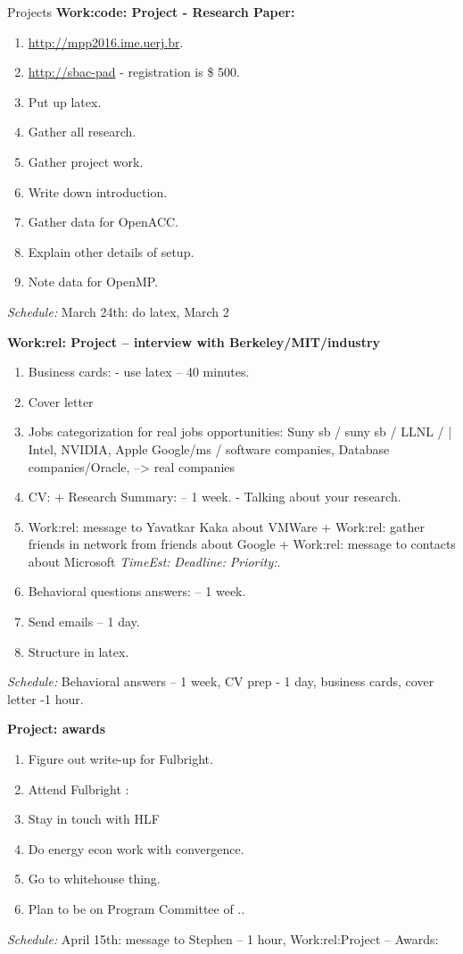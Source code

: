 \documentclass[serif, mathserif, final]{beamer}
\newcommand{\te}[1]{\textit{TimeEst:}\textit{#1}}
\newcommand{\dl}[1]{\textit{Deadline:}\textit{#1}}
\newcommand{\pr}[1]{\textit{Priority:}\textit{#1}}
\begin{document}
\begin{frame}
\begin{columns}
\begin{block}{Projects}
{\bf Work:code: Project - Research Paper:}  
\begin{enumerate} 
\item \tiny \url{http://mpp2016.ime.uerj.br}. 
\item \tiny \url {http://sbac-pad}  - registration is  \$ 500. 
\item \tiny Put up latex.  
\item \tiny Gather all research. 
\item \tiny Gather project work. 
\item \tiny Write down introduction.
\item \tiny Gather data for OpenACC. 
\item \tiny Explain other details of setup. 
\item \tiny Note data for OpenMP. 
\end{enumerate} 
\textit{Schedule:} March 24th: do latex, March 2

{\bf Work:rel: Project – interview with Berkeley/MIT/industry} 
\begin{enumerate} 
\tiny \item \tiny Business cards:  - use latex  -- 40 minutes. 
\tiny \item \tiny Cover letter 
\tiny \item \tiny Jobs categorization for real jobs opportunities: 
Suny sb / suny sb / LLNL /  |  Intel, NVIDIA, Apple  Google/ms /
software companies, Database companies/Oracle,  --> real companies 
\tiny \item \tiny CV: + Research Summary:  -- 1 week.  - Talking about
your research.
\item \tiny Work:rel: message to Yavatkar Kaka about VMWare +
  Work:rel: gather friends in network from friends about Google +
  Work:rel: message to contacts about Microsoft \te{} \dl{} \pr{}. 
\item \tiny Behavioral questions answers:    -- 1 week. 
\item \tiny Send emails – 1 day. 
\item \tiny Structure in latex. 
\end{enumerate}  
\textit{Schedule:} Behavioral answers – 1 week, CV prep - 1 day,
business cards, cover letter -1 hour. 

{\bf Project: awards}
\begin{enumerate} 
\tiny \item \tiny Figure out write-up for Fulbright. 
\item \tiny Attend Fulbright : 
\item \tiny Stay in touch with HLF 
\item \tiny Do energy econ work with convergence. 
\item \tiny Go to whitehouse thing. 
\item \tiny Plan to be on Program Committee of .. 
\end{enumerate} 
\textit{Schedule:} April 15th: message to Stephen – 1 hour,
Work:rel:Project – Awards: 


\end{block}
\end{columns}
\end{frame}
\end{document}
